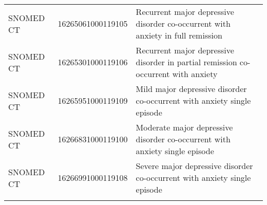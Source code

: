 \begin{longtable}{p{}p{}p{}}
  SNOMED CT & 16265061000119105 & Recurrent major depressive disorder co-occurrent with anxiety in full remission \\ 
  SNOMED CT & 16265301000119106 & Recurrent major depressive disorder in partial remission co-occurrent with anxiety \\ 
  SNOMED CT & 16265951000119109 & Mild major depressive disorder co-occurrent with anxiety single episode \\ 
  SNOMED CT & 16266831000119100 & Moderate major depressive disorder co-occurrent with anxiety single episode \\ 
  SNOMED CT & 16266991000119108 & Severe major depressive disorder co-occurrent with anxiety single episode \\ 
  \hline
\label{tab:codes_anxiety}
\end{longtable}
